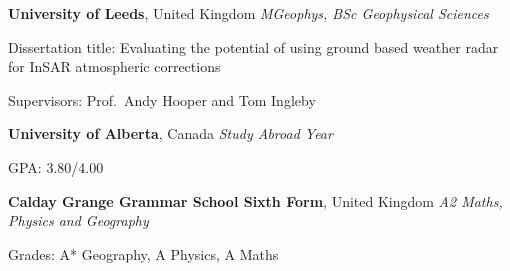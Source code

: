 %
\textbf{University of Leeds}, United Kingdom \newline
\emph{MGeophys, BSc Geophysical Sciences} 
\begin{itemize*}
\item Dissertation title: Evaluating the potential of using ground based weather
  radar for InSAR atmospheric corrections
\item Supervisors: Prof.~Andy Hooper and Tom Ingleby
\end{itemize*}

\medskip
\textbf{University of Alberta}, Canada \newline
\emph{Study Abroad Year} 
\begin{itemize*}
\item GPA\@: 3.80/4.00
\end{itemize*}

\medskip
\textbf{Calday Grange Grammar School Sixth Form}, United Kingdom \newline
\emph{A2 Maths, Physics and Geography} 
\begin{itemize*}
\item Grades: A* Geography, A Physics, A Maths
\end{itemize*}

\bigskip
